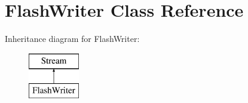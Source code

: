 \hypertarget{class_flash_writer}{}\section{Flash\+Writer Class Reference}
\label{class_flash_writer}
Inheritance diagram for Flash\+Writer\+:\begin{figure}[H]
\begin{center}
\leavevmode
\includegraphics[height=2.000000cm]{class_flash_writer}
\end{center}
\end{figure}
